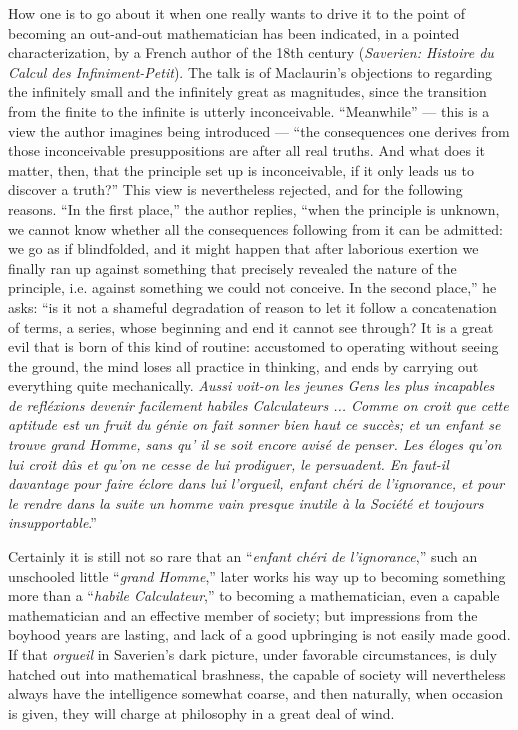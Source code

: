 \documentclass[12pt,a4paper,openany]{book}
\newcommand{\opage}[1]{\marginnote{\footnotesize\textit{[#1]}}}
\begin{document}
How one is to go about it when one really wants to
drive it to the point of becoming an out-and-out mathematician has been indicated, in a pointed characterization, by a French author
of the 18th century (\textit{Saverien: Histoire du
Calcul des Infiniment-Petit}).
The talk is of Maclaurin's objections to regarding the
infinitely small and the infinitely great as magnitudes, since
\opage{III}the transition from the finite to the infinite is utterly
inconceivable. ``Meanwhile'' --- this is a view the author
imagines being introduced --- ``the consequences
one derives from those inconceivable presuppositions are after all real
truths. And what does it matter, then, that the principle set up
is inconceivable, if it only leads us to
discover a truth?'' This view is nevertheless rejected,
and for the following reasons. ``In the first place,'' the author replies,
``when the principle is unknown, we cannot know
whether all the consequences following from it can be admitted:
we go as if blindfolded, and it might happen that after
laborious exertion we finally ran up against something that precisely
revealed the nature of the principle, i.e. against something we could not
conceive. In the second place,'' he asks: ``is it not
a shameful degradation of reason to let it
follow a concatenation of terms, a series, whose beginning
and end it cannot see through? It is a great evil
that is born of this kind of routine: accustomed to operating without
seeing the ground, the mind loses all practice in thinking, and
ends by carrying out everything quite mechanically. \textit{Aussi voit-on
les jeunes Gens les plus incapables de refléxions devenir
facilement habiles Calculateurs ... Comme on croit que
cette aptitude est un fruit du génie on fait sonner bien
haut ce succès; et un enfant se trouve grand Homme,
sans qu’ il se soit encore avisé de penser. Les éloges
qu’on lui croit dûs et qu’on ne cesse de lui prodiguer, le
persuadent. En faut-il davantage pour faire éclore dans
lui l’orgueil, enfant chéri de l’ignorance, et pour le rendre
dans la suite un homme vain presque inutile à la Société
et toujours insupportable}.''

Certainly it is still not so rare that an ``\textit{enfant
chéri de l’ignorance},'' such an unschooled little ``\textit{grand
Homme},'' later works his way up to becoming something more
than a ``\textit{habile Calculateur},'' to becoming a mathematician, even
a capable mathematician and an effective member of society; but
\opage{IV}impressions from the boyhood years are lasting, and lack of a good
upbringing is not easily made good. If that \textit{orgueil} in Saverien's
dark picture, under favorable circumstances,
is duly hatched out into mathematical brashness, the capable
of society will nevertheless always have the intelligence somewhat coarse,
and then naturally, when occasion is given, they will charge at
philosophy in a great deal of wind.
\end{document}
